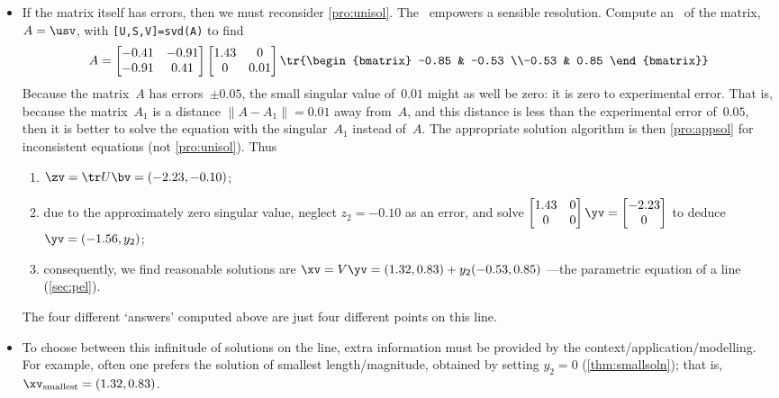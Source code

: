 \begin{example}
\begin{solution}
\begin{itemize}
\item If the matrix itself has errors, then we must reconsider \autoref{pro:unisol}.
The \svd\ empowers a sensible resolution.
Compute an \svd\ of the matrix, \(A=\usv\), with \verb|[U,S,V]=svd(A)| to find \twodp
\setbox\ajrqrbox\hbox{}%
\marginpar{\usebox{\ajrqrbox\\[2ex]}}%
\begin{equation*}
A=\begin{bmatrix} -0.41 & -0.91
\\-0.91 &  0.41 \end{bmatrix}
\begin{bmatrix} 1.43 & 0
\\0 &  0.01 \end{bmatrix}
\tr{\begin{bmatrix} -0.85 & -0.53
\\-0.53 &  0.85 \end{bmatrix}}
\end{equation*}
Because the matrix~\(A\) has errors~\(\pm0.05\), the small singular value of~\(0.01\) might as well be zero: it is zero to experimental error.
That is, because the matrix~\(A_1\) is a distance \(\|A-A_1\|=0.01\) away from~\(A\), and this distance is less than the experimental error of~\(0.05\), then it is better to solve the equation with the singular~\(A_1\) instead of~\(A\).
The appropriate solution algorithm is then \autoref{pro:appsol} for inconsistent equations (not \autoref{pro:unisol}).
Thus \twodp
\begin{enumerate}
\item \(\zv=\tr U\bv=(-2.23,-0.10)\);
\item due to the approximately zero singular value, neglect \(z_2=-0.10\) as an error, and solve
\(\begin{bmatrix} 1.43 & 0
\\0 &  0 \end{bmatrix}\yv=\begin{bmatrix} -2.23\\0 \end{bmatrix}\)
to deduce \(\yv=(-1.56,y_2)\);
\item consequently, we find reasonable solutions are \(\xv=V\yv=(1.32,0.83)+y_2(-0.53,0.85)\) ---the parametric equation of a line (\autoref{sec:pel}).
\end{enumerate}
The four different `answers' computed above are just four different points on this line.

\item To choose between this infinitude of solutions on the line, extra information must be provided by the context\slash application\slash modelling.  
For example, often one prefers the solution of smallest length\slash magnitude, obtained by setting \(y_2=0\) (\autoref{thm:smallsoln}); that is, \(\xv_{\text{smallest}}=(1.32,0.83)\).
\end{itemize}
\end{solution}
\end{example}




